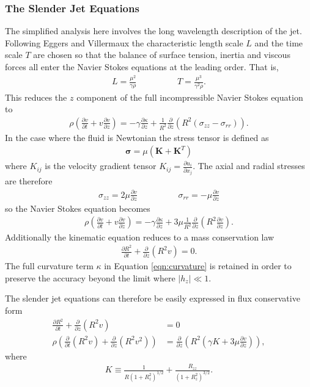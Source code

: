 \documentclass[11pt]{article}
\newcommand{\pd}[2]{\frac{\partial #1}{\partial #2}}
\begin{document}
\subsubsection{The Slender Jet Equations} \label{sec:slender}
The simplified analysis here involves the long wavelength description of the jet. Following Eggers and Villermaux \cite{eggers2008physics} the characteristic length scale $L$ and the time scale $T$ are chosen so that the balance of surface tension, inertia and viscous forces all enter the Navier Stokes equations at the leading order. That is,
\begin{align*}
L = \frac{\mu^2}{\gamma \rho} \hspace{2cm} T = \frac{\mu^3}{\gamma^2 \rho}.
\end{align*}
This reduces the $z$ component of the full incompressible Navier Stokes equation to
\begin{align*}
\rho \left( \pd{v}{t} + v \pd{v}{z} \right) = -\gamma \pd{\kappa}{z} + \frac{1}{R^2} \pd{}{z} \left(R^2 (\sigma_{zz} - \sigma_{rr}) \right).
\end{align*}
In the case where the fluid is Newtonian the stress tensor is defined as
\begin{align*}
\mathbf{\sigma} = \mu (\mathbf{K} + \mathbf{K}^T)
\end{align*}
where $K_{ij}$ is the velocity gradient tensor $K_{ij} = \pd{u_i}{x_j}$. The axial and radial stresses are therefore
\begin{align*}
\sigma_{zz} = 2\mu \pd{v}{z} \hspace{2cm} \sigma_{rr} = -\mu \pd{v}{z}
\end{align*}
so the Navier Stokes equation becomes
\begin{align*}
\rho \left( \pd{v}{t} + v \pd{v}{z} \right) = - \gamma \pd{\kappa}{z} + 3 \mu \frac{1}{R^2} \pd{}{z} \left(R^2 \pd{v}{z} \right).
\end{align*}
Additionally the kinematic equation reduces to a mass conservation law
\begin{align*}
\pd{R^2}{t} + \pd{}{z}(R^2 v) = 0.
\end{align*}
The full curvature term $\kappa$ in Equation \ref{eqn:curvature} is retained in order to preserve the accuracy beyond the limit where $|h_z| \ll 1$.

The slender jet equations can therefore be easily expressed in flux conservative form
\begin{align}
\pd{R^2}{t} + \pd{}{z} (R^2v) &= 0 \label{eqn:mass_con} \\
\rho \left( \pd{}{t} (R^2v) + \pd{}{z} (R^2v^2) \right) &= \pd{}{z} \left(R^2 \left( \gamma K + 3 \mu \pd{v}{z}\right) \right), \label{eqn:mom_con}
\end{align}
where
\begin{align*}
K \equiv \frac{1}{R(1+R_z^2)^{1/2}} + \frac{R_{zz}}{(1 + R_z^2)^{3/2}}.
\end{align*}
\end{document}
